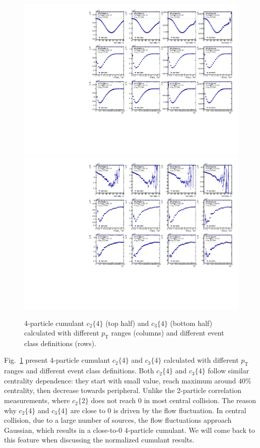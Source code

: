 \begin{figure}[H]
\centering
\includegraphics[width=.95\linewidth]{figs/sec_result/forQM/phy_c4_Har2.pdf}
\includegraphics[width=.95\linewidth]{figs/sec_result/forQM/phy_c4_Har3.pdf}
\caption{4-particle cumulant $c_2\{4\}$ (top half) and $c_3\{4\}$ (bottom half) calculated with different $p_\text{T}$ ranges (columns) and different event class definitions (rows).}
\label{fig:result_phy_c4_Har23}
\end{figure}
Fig.~\ref{fig:result_phy_c4_Har23} present 4-particle cumulant $c_2\{4\}$ and $c_3\{4\}$ calculated with different $p_\text{T}$ ranges and different event class definitions. Both $c_2\{4\}$ and $c_3\{4\}$ follow similar centrality dependence: they start with small value, reach maximum around $40\%$ centrality, then decrease towards peripheral. Unlike the 2-particle correlation measurements, where $c_2\{2\}$ does not reach 0 in most central collision. The reason why $c_2\{4\}$ and $c_3\{4\}$ are close to 0 is driven by the flow fluctuation. In central collision, due to a large number of sources, the flow fluctuations approach Gaussian, which results in a close-to-0 4-particle cumulant. We will come back to this feature when discussing the normalized cumulant results.

